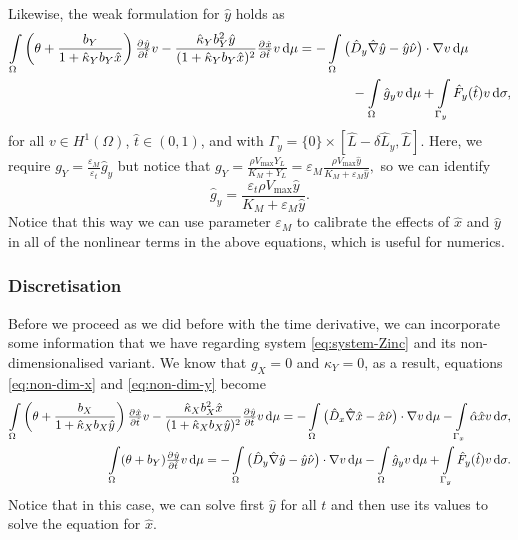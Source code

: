 \documentclass[a4paper,doc,11pt]{article}
\begin{document}
Likewise, the weak formulation for \(\hat y\) holds as
\begin{equation}
\label{eq:non-dim-y}
\begin{aligned}
    \int\limits_\Omega
    \left( \theta + \frac{b_Y}{1 + \hat{\kappa}_Y b_Y \hat{x}} \right)  \pd{\hat{y}}{\hat{t}} v 
    -
    \frac{\hat{\kappa}_Y b_Y^2 \hat{y}}{(1+\hat{\kappa}_Y b_Y \hat{x})^2} \pd{\hat x}{\hat t} v
    \dif\mu
    &=
    -\int\limits_\Omega 
    \big(\hat{D}_y \hat{\nabla} \hat{y} - \hat{y}\hat{\nu} \big) \cdot \nabla v \dif\mu
    \\
    &\qquad\qquad
    -\int\limits_\Omega \hat{g}_y v \dif\mu
    +\int\limits_{\Gamma_{y}}    \hat{F}_y (\hat t) v    \dif \sigma,
\end{aligned}
\end{equation}
for all \( v\in H^1 (\Omega)\), \(\hat{t}\in (0,1)\), and
with $\Gamma_{y} = \{0\}\times [\hat{L}-\delta \hat{L}_y,\hat{L}]$. Here, we require \( g_Y = \frac{\varepsilon_M}{\varepsilon_t} \hat{g}_y \) but notice that
\(
    g_Y = \frac{\rho V_{\max} Y_L}{K_M + Y_L}
    = \varepsilon_M \frac{\rho V_{\max} \hat{y}}{K_M + \varepsilon_M \hat{y}},
\)
so we can identify \[ \hat{g}_y = \frac{ \varepsilon_t \rho V_{\max} \hat{y}}{K_M + \varepsilon_M \hat{y}}. \]
Notice that this way we can use parameter \(\varepsilon_M\) to calibrate the effects of \( \hat{x}\) and \(\hat{y}\) in all of the nonlinear terms in the above equations, which is useful for numerics.

\subsubsection{Discretisation}
Before we proceed as we did before with the time derivative, we can incorporate some information that we have regarding system \eqref{eq:system-Zinc} and its non-dimensionalised variant. We know that \(g_X = 0\) and \( \kappa_Y = 0\), as a result, equations \eqref{eq:non-dim-x} and \eqref{eq:non-dim-y} become
\begin{align}
    \int\limits_\Omega
    \left( \theta + \frac{b_X}{1 + \hat{\kappa}_X b_X \hat{y}} \right)  \pd{\hat{x}}{\hat{t}} v 
    -
    \frac{\hat{\kappa}_X b_X^2 \hat{x}}{(1+\hat{\kappa}_X b_X \hat{y})^2} \pd{\hat y}{\hat t} v
    \dif\mu
    =
    -\int\limits_\Omega 
    \big( \hat{D}_x \hat{\nabla} \hat{x} - \hat{x}\hat{\nu}\big) \cdot \nabla v \dif\mu
    -\int\limits_{\Gamma_{x}}    \hat{\alpha} \hat{x} v    \dif \sigma,
    \\
    \int\limits_\Omega
    ( \theta + b_Y )  \pd{\hat{y}}{\hat{t}} v 
    \dif\mu
    =
    -\int\limits_\Omega 
    \big(\hat{D}_y \hat{\nabla} \hat{y} - \hat{y}\hat{\nu} \big) \cdot \nabla v \dif\mu
    -\int\limits_\Omega \hat{g}_y v \dif\mu
    +\int\limits_{\Gamma_{y}}    \hat{F}_y (\hat t) v    \dif \sigma.
\end{align}
Notice that in this case, we can solve first \(\hat{y}\) for all \(t\) and then use its values to solve the equation for \(\hat{x}\).
\end{document}
